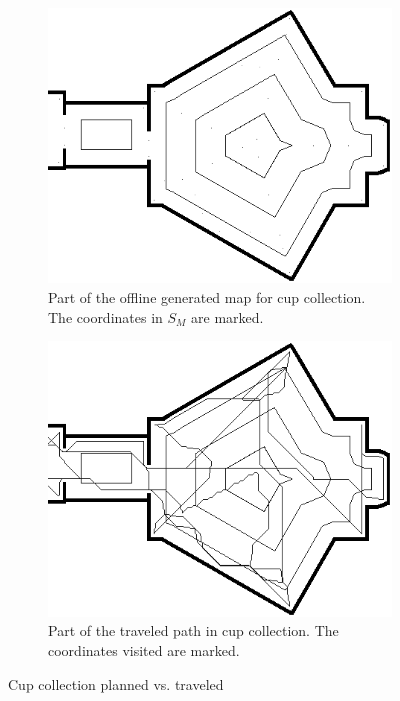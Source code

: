 \begin{figure}[ht]
\centering
  \begin{subfigure}[t]{0.3\textwidth}
    \includegraphics[width = \textwidth]{graphics/cup_collect_plan}
    \caption{Part of the offline generated map for cup collection. The coordinates in \(S_{M}\) are marked.}
    \label{cup_collect_plan}
  \end{subfigure}
  \begin{subfigure}[t]{0.3\textwidth}
    \includegraphics[width = \textwidth]{graphics/cup_collect_robot}
    \caption{Part of the traveled path in cup collection. The coordinates visited are marked.}
    \label{cup_collect_robot}
  \end{subfigure}
\caption{Cup collection planned vs. traveled}
\label{cup_collection_results}
\end{figure}